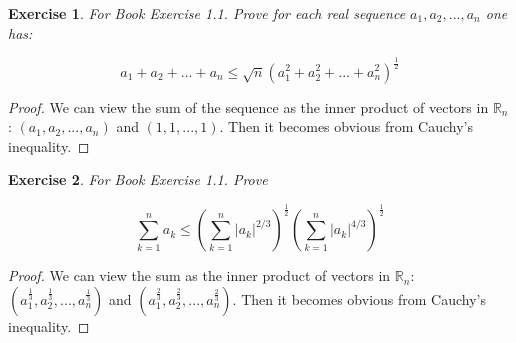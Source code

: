 \documentclass{article}
\newtheorem{exercise}{Exercise}[section]
\begin{document}
\begin{exercise}
    For Book Exercise 1.1. Prove for each real sequence $a_1, a_2, ..., a_n$ one has:

    \begin{equation*}
        a_1 + a_2 + ... + a_n \leq \sqrt{n}(a_1^2 + a_2^2 + ... + a_n^2)^{\frac{1}{2}}
    \end{equation*}

\end{exercise}

\begin{proof}
    We can view the sum of the sequence as the inner product of vectors in $\mathbb{R}_n$: $(a_1, a_2, ..., a_n)$ and $(1, 1, ..., 1)$. Then it becomes obvious from Cauchy's inequality.
\end{proof}
\begin{exercise}
    For Book Exercise 1.1. Prove 

    \begin{equation*}
        \sum_{k=1}^{n}{a_k} \leq (\sum_{k=1}^{n}{|a_k|^{2/3}})^{\frac{1}{2}} (\sum_{k=1}^{n}{|a_k|^{4/3}})^{\frac{1}{2}}
    \end{equation*}

\end{exercise}

\begin{proof}
    We can view the sum as the inner product of vectors in $\mathbb{R}_n$: $(a_1^{\frac{1}{3}}, a_2^{\frac{1}{3}}, ..., a_n^{\frac{1}{3}})$ and $(a_1^{\frac{2}{3}}, a_2^{\frac{2}{3}}, ..., a_n^{\frac{2}{3}})$. Then it becomes obvious from Cauchy's inequality.
\end{proof}
\end{document}
